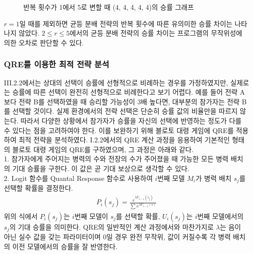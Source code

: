 \begin{figure}[htb!]
    \vspace{1em}
    \centering
    \pgfplotsset{width=0.8\textwidth, height=0.48\textwidth}
    \caption{반복 횟수가 1에서 5로 변할 때 (4, 4, 4, 4, 4)의 승률 그래프}
    \label{fig:enter-label}
\end{figure}

$r=1$일 때를 제외하면 균등 분배 전략의 반복 횟수에 따른 유의미한 승률 차이는 나타나지 않았다. $2 \leq r \leq 5$에서의 균등 분배 전략의 승률 차이는 프로그램의 무작위성에 의한 오차로 판단할 수 있다.

\subsubsection{QRE를 이용한 최적 전략 분석}
III.2.2에서는 상대의 선택이 승률에 선형적으로 비례하는 경우를 가정하였지만, 실제로는 승률에 따른 선택이 완전히 선형적으로 비례한다고 보기 어렵다. 예를 들어 전략 A보다 전략 B를 선택하였을 때 승리할 가능성이 3배 높다면, 대부분의 참가자는 전략 B를 선택할 것이다. 실제 환경에서의 전략 선택은 단순히 승률 값의 비율만을 따르지 않는다. 따라서 다양한 상황에서 참가자가 승률을 자신의 선택에 반영하는 정도가 다를 수 있다는 점을 고려하여야 한다. 이를 보완하기 위해 블로토 대령 게임에 QRE를 적용하여 최적 전략을 분석하였다. I.2.2에서의 QRE 계산 과정을 응용하여 기본적인 형태의 블로토 대령 게임의 QRE를 구하였으며, 그 과정은 아래와 같다.\\
1. 참가자에게 주어지는 병력의 수와 전장의 수가 주어졌을 때 가능한 모든 병력 배치의 기대 승률을 구한다. 이 값은 곧 기대 보상으로 생각할 수 있다.\\
2. Logit 함수를 Quantal Response 함수로 사용하여 $i$번째 모델 $M_i$가 병력 배치 $s_j$를 선택할 확률을 결정한다.
\begin{align}
    P_i(s_j)= \frac{e^{\lambda U_{i-1}(s_j)}}{\sum_{}^{} e^{\lambda U_{i-1}(s)}}
\end{align}
위의 식에서 $P_i(s_j)$는 $i$번째 모델이 $s_j$를 선택할 확률, $U_i(s_j)$는 $i$번째 모델에서의 $s_j$의 기대 승률을 의미한다. QRE의 일반적인 계산 과정에서와 마찬가지로 $\lambda$는 음이 아닌 실수 값을 갖는 파라미터이며 0일 경우 완전 무작위, 값이 커질수록 각 병력 배치의 이전 모델에서의 승률을 잘 반영한다.

